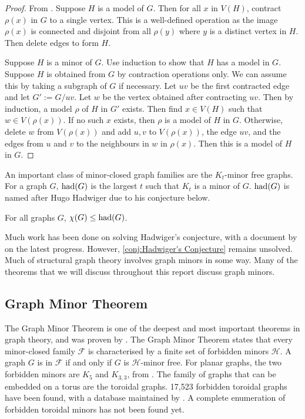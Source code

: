 \begin{proof}
	From \textcite{norinMath599GraphMinors2017}. Suppose \(H\) is a model of \(G\). Then for all \(x\) in \(V(H)\), contract \(\rho(x)\) in \(G\) to a single vertex. This is a well-defined operation as the image $\rho(x)$ is connected and disjoint from all $\rho(y)$ where $y$ is a distinct vertex in $H$. Then delete edges to form \(H\).

	Suppose $H$ is a minor of $G$. Use induction to show that \(H\) has a model in \(G\). Suppose \(H\) is obtained from \(G\) by contraction operations only. We can assume this by taking a subgraph of \(G\) if necessary. Let \(uv\) be the first contracted edge and let \(G' := G / uv\). Let \(w\) be the vertex obtained after contracting \(uv\). Then by induction, a model \(\rho\) of \(H\) in \(G'\) exists. Then find $x \in V(H)$ such that $w \in V(\rho(x))$. If no such $x$ exists, then $\rho$ is a model of $H$ in $G$. Otherwise, delete \(w\) from \(V(\rho(x)) \) and add $u, v$ to $V(\rho(x))$, the edge $uv$, and the edges from $u$ and $v$ to the neighbours in $w$ in $\rho(x)$. Then this is a model of \(H\) in \(G\). 
\end{proof}

An important class of minor-closed graph families are the \(K_t\)-minor free graphs. For a graph \(G\), \(\operatorname{had}(G)\) is the largest \(t\) such that \(K_t\) is a minor of \(G\). $\operatorname{had}(G)$ is named after Hugo Hadwiger due to his conjecture below.
\begin{conjecture}\label{conj:Hadwiger's Conjecture}
	For all graphs \(G\), \(\chi(G) \leq \operatorname{had}(G)\).
\end{conjecture}
Much work has been done on solving Hadwiger's conjecture, with a document by \textcite{seymourHadwigersConjecture2016} on the latest progress. However, \cref{conj:Hadwiger's Conjecture} remains unsolved. Much of structural graph theory involves graph minors in some way. Many of the theorems that we will discuss throughout this report discuss graph minors. 

 \subsection{Graph Minor Theorem}
The Graph Minor Theorem is one of the deepest and most important theorems in graph theory, and was proven by \textcite{robertsonGraphMinorsXX2004}. The Graph Minor Theorem states that every minor-closed family $\mathcal{F}$ is characterised by a finite set of forbidden minors $\mathcal{H}$. A graph $G$ is in $\mathcal{F}$ if and only if $G$ is $\mathcal{H}$-minor free.
For planar graphs, the two forbidden minors are \(K_5\) and \(K_{3,3}\), from \textcite{wagnerUeberEigenschaftEbenen1937}. 
The family of graphs that can be embedded on a torus are the toroidal graphs.  17,523 forbidden toroidal graphs have been found, with a database maintained by \textcite{myrvoldLargeSetTorus2018}. A complete enumeration of forbidden toroidal minors has not been found yet.

